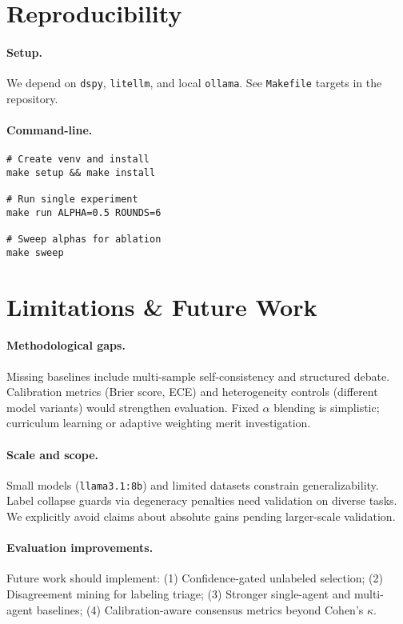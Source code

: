 \documentclass[11pt]{article}
\begin{document}
\section{Reproducibility}
\paragraph{Setup.}
We depend on \texttt{dspy}, \texttt{litellm}, and local \texttt{ollama}.
See \texttt{Makefile} targets in the repository.

\paragraph{Command-line.}
\begin{lstlisting}[basicstyle=\ttfamily\small]
# Create venv and install
make setup && make install

# Run single experiment
make run ALPHA=0.5 ROUNDS=6

# Sweep alphas for ablation
make sweep
\end{lstlisting}

\section{Limitations \& Future Work}
\paragraph{Methodological gaps.} 
Missing baselines include multi-sample self-consistency and structured debate.
Calibration metrics (Brier score, ECE) and heterogeneity controls (different model variants) would strengthen evaluation.
Fixed $\alpha$ blending is simplistic; curriculum learning or adaptive weighting merit investigation.

\paragraph{Scale and scope.} 
Small models (\texttt{llama3.1:8b}) and limited datasets constrain generalizability.
Label collapse guards via degeneracy penalties need validation on diverse tasks.
We explicitly avoid claims about absolute gains pending larger-scale validation.

\paragraph{Evaluation improvements.}
Future work should implement: (1) Confidence-gated unlabeled selection; (2) Disagreement mining for labeling triage; (3) Stronger single-agent and multi-agent baselines; (4) Calibration-aware consensus metrics beyond Cohen's $\kappa$.
\end{document}
